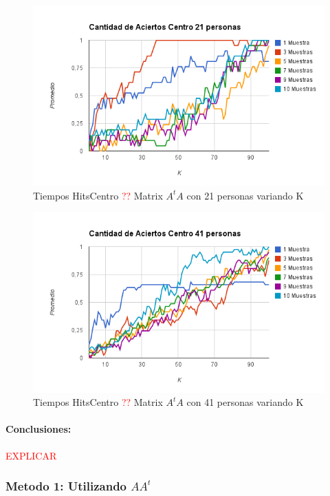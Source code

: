 \begin{figure}[H]
\includegraphics[width=1\textwidth]{img/image14.png}
     \caption{Tiempos HitsCentro \textcolor{red}{??} Matrix $A^tA$ con 21 personas variando K}
     \label{fig:figura1}
\end{figure}

\begin{figure}[H]
\includegraphics[width=1\textwidth]{img/image15.png}
     \caption{Tiempos HitsCentro \textcolor{red}{??} Matrix $A^tA$ con 41 personas variando K}
     \label{fig:figura1}
\end{figure}

\paragraph{Conclusiones:}

\textcolor{red}{EXPLICAR}


\subsubsection{Metodo 1: Utilizando $AA^t$}

